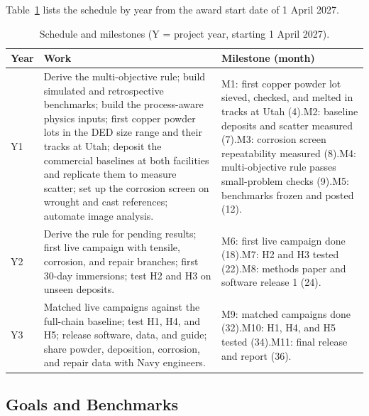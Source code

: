 \documentclass[12pt,letterpaper]{article}
\begin{document}
Table~\ref{tab:schedule} lists the schedule by year from the award start
date of 1 April 2027.

\begin{table}[h]
\centering
\caption{Schedule and milestones (Y = project year, starting 1 April 2027).}
\label{tab:schedule}
\renewcommand{\arraystretch}{1.15}
\begin{tabularx}{\textwidth}{@{}p{0.4in}>{\raggedright\arraybackslash}X>{\raggedright\arraybackslash}p{2.05in}@{}}
\toprule
\textbf{Year} & \textbf{Work} & \textbf{Milestone (month)} \\
\midrule
Y1 & Derive the multi-objective rule; build simulated and retrospective
benchmarks; build the process-aware physics inputs; first copper powder lots
in the DED size range and their tracks at Utah; deposit the commercial
baselines at both facilities and replicate them to measure scatter; set up the corrosion screen on wrought and cast references;
automate image analysis. & M1: first copper powder lot sieved, checked, and
melted in tracks at Utah (4).\newline M2: baseline deposits and scatter measured (7).\newline M3:
corrosion screen repeatability measured (8).\newline M4: multi-objective rule
passes small-problem checks (9).\newline M5: benchmarks frozen and posted
(12). \\
Y2 & Derive the rule for pending results; first live campaign with tensile,
corrosion, and repair branches; first 30-day immersions; test H2 and H3 on
unseen deposits. & M6: first live campaign done (18).\newline M7: H2 and H3
tested (22).\newline M8: methods paper and software release 1 (24). \\
Y3 & Matched live campaigns against the full-chain baseline; test H1, H4, and
H5; release software, data, and guide; share powder, deposition, corrosion,
and repair data with Navy engineers. & M9: matched campaigns done
(32).\newline M10: H1, H4, and H5 tested (34).\newline M11: final release and
report (36). \\
\bottomrule
\end{tabularx}
\end{table}

\subsection{Goals and Benchmarks}
\end{document}
